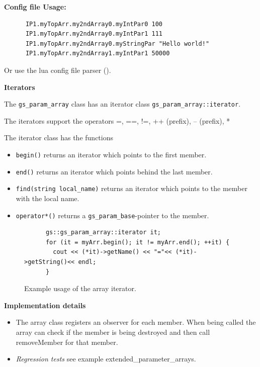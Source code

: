 \vspace{.5cm}

\noindent
\begin{minipage}{\textwidth}
{\bf Config file Usage:}
\begin{lstlisting}
      IP1.myTopArr.my2ndArray0.myIntPar0 100
      IP1.myTopArr.my2ndArray0.myIntPar1 111
      IP1.myTopArr.my2ndArray0.myStringPar "Hello world!"
      IP1.myTopArr.my2ndArray1.myIntPar1 50000
\end{lstlisting}
Or use the lua config file parser ().
\end{minipage}

\noindent
{\bf Iterators}

The \lstinline|gs_param_array| class has an iterator class \lstinline|gs_param_array::iterator|.

The iterators support the operators \textsf{=, ==, !=, ++ (prefix), -- (prefix), *}

The iterator class has the functions
\begin{itemize}
    \item \lstinline|begin()| returns an iterator which points to the first member.
    \item \lstinline|end()| returns an iterator which points behind the last member.
    \item \lstinline|find(string local_name)| returns an iterator which points to the member with the local name.
    \item \lstinline|operator*()| returns a \lstinline|gs_param_base|-pointer to the member.
\end{itemize}

\begin{figure}[H]
\begin{lstlisting}
      gs::gs_param_array::iterator it;
      for (it = myArr.begin(); it != myArr.end(); ++it) {
        cout << (*it)->getName() << "="<< (*it)->getString()<< endl;
      }
\end{lstlisting}
  \caption{Example usage of the array iterator.}
  \label{fig:ExtParamInterUse}
\end{figure}


\noindent
{\bf Implementation details}

\begin{itemize}
    \item The array class registers an observer for each member. When being called the array can check if the member is being destroyed and then call removeMember for that member.
    \item {\em Regression tests} see example \textsf{extended\_parameter\_arrays}.
\end{itemize}

